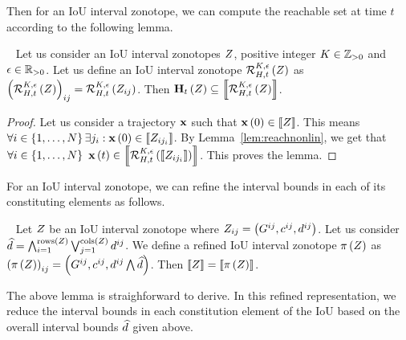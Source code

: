 %
Then for an IoU interval zonotope, we can compute the reachable
set at time $t$ according to the following lemma.
%
\begin{lemma}~\label{lem:ioureach}
Let us consider an IoU interval zonotopes $Z$, positive integer
$K\in\mathbb{Z}_{> 0}$ and $\epsilon\in\mathbb{R}_{>0}$.  Let us define an
IoU interval zonotope $\mathcal{R}_{H,t}^{K,\epsilon}\left(Z\right)$ as\\
%
$
\left(\mathcal{R}_{H,t}^{K,\epsilon}\left(Z\right)\right)_{ij}
= \mathcal{R}_{H,t}^{K,\epsilon}\left(Z_{ij}\right)
$.
%
Then
$\mathbf{H}_{t}\left(Z\right)\subseteq \left\llbracket{\mathcal{R}_{H,t}^{K,\epsilon}\left(Z\right)}\right\rrbracket$.
\end{lemma}
%
\begin{proof}
Let us consider a trajectory $\mathbf{x}$ such that
$\mathbf{x}\left(0\right)\in\left\llbracket{Z}\right\rrbracket$.  This means $\forall
i\in\left\{1,\ldots,N\right\} \exists j_i:\mathbf{x}\left(0\right)\in\left\llbracket{Z_{ij_i}}\right\rrbracket$.  By
Lemma~\ref{lem:reachnonlin}, we get that $\forall
i\in\left\{1,\ldots,N\right\}~\mathbf{x}\left(t\right)\in\left\llbracket{\mathcal{R}_{H,t}^{K,\epsilon}\left(\left\llbracket{Z_{ij_i}}\right\rrbracket\right)}\right\rrbracket$.
This proves the lemma.
\end{proof}
%
For an IoU interval zonotope, we can refine the interval bounds in
each of its constituting elements as follows. 
%
\begin{lemma}~\label{lem:refine}
Let $Z$ be an IoU interval zonotope where $Z_{ij}
= \left(G^{ij},c^{ij},d^{ij}\right)$.  Let us consider $\widehat{d}
= \bigwedge_{i=1}^{\operatorname{rows}\left(Z\right)}\bigvee_{j=1}^{\operatorname{cols}\left(Z\right)}d^{ij}$.  We
define a refined IoU interval zonotope $\operatorname*{\pi}\left(Z\right)$ as
%
$
\left(\operatorname*{\pi}\left(Z\right)\right)_{ij}
= \left(G^{ij},{c^{ij}},{d^{ij}\bigwedge \widehat{d}}\right)
$.
%
Then $\left\llbracket{Z}\right\rrbracket = \left\llbracket{\operatorname*{\pi}\left(Z\right)}\right\rrbracket$.
\end{lemma}
%
The above lemma is straighforward to derive.  In this refined
representation, we reduce the interval bounds in each constitution
element of the IoU based on the overall interval bounds $\widehat{d}$
given above.

